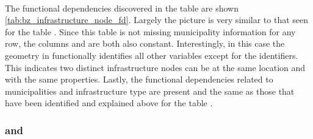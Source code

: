 \paragraph{}
The functional dependencies discovered in the  table are shown \cref{tab:bz_infrastructure_node_fd}. Largely the picture is very similar to that seen for the table .
Since this table is not missing municipality information for any row, the columns  and  are both also constant.
Interestingly, in this case the geometry in  functionally identifies all other variables except for the identifiers. This indicates two distinct infrastructure nodes can be at the same location and with the same properties.
Lastly, the functional dependencies related to municipalities and infrastructure type are present and the same as those that have been identified and explained above for the table .


\subsubsection{\texorpdfstring{ and }{bz\_hazard\_landslide and bz\_hazard\_avalanche}}

